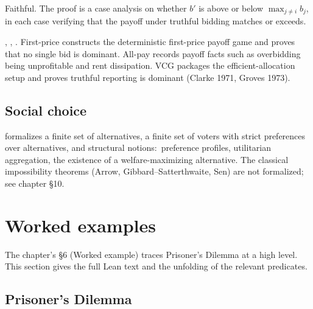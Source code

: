 \Faithfulness
Faithful.  The proof is a case analysis on whether $b'$ is above
or below $\max_{j \neq i} b_j$, in each case verifying that the
payoff under truthful bidding matches or exceeds.

\Variants
{}, ,
.  First-price constructs the deterministic
first-price payoff game and proves that no single bid is dominant.
All-pay records payoff facts such as overbidding being unprofitable
and rent dissipation.  VCG packages the efficient-allocation setup
and proves truthful reporting is dominant
(Clarke 1971, Groves 1973).

\subsection{Social choice}
\label{sec:supp:social-choice}

 formalizes a finite set of
alternatives, a finite set of voters with strict preferences over
alternatives, and structural notions:\ preference profiles,
utilitarian aggregation, the existence of a welfare-maximizing
alternative.  The classical impossibility theorems (Arrow,
Gibbard–Satterthwaite, Sen) are not formalized; see chapter §10.

\section{Worked examples}
\label{sec:supp:examples}

The chapter's §6 (Worked example) traces Prisoner's Dilemma at a
high level.  This section gives the full Lean text and the
unfolding of the relevant predicates.

\subsection{Prisoner's Dilemma}
\label{sec:supp:examples:pd}

